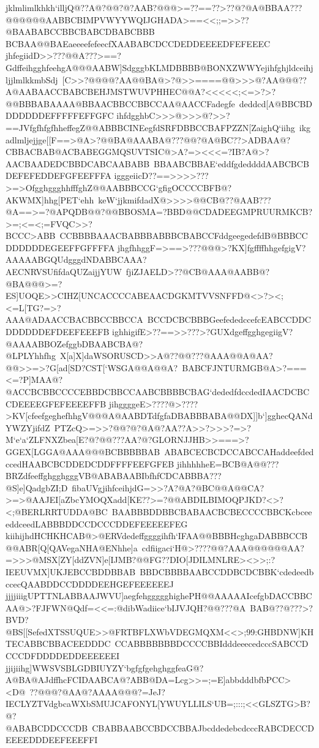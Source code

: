 {{{ jklmlimlkhkh`illjQ@??A@?@@?@?AAB?@@@>=??==??>??@?@A@BBAA???@@@@@@AABBCBIMPVWYYWQIJGHADA>==<<;;=>>??@BAABABCCBBCBABCDBABCBBB%
 BCBAA@@BAEaeeeefefeecfXAABABCDCCDEDDEEEEDFEFEEEC}
 \hbox{jhfegiidD>>???@@A???>==?GdffeihgghfeehgA@@@AABW]SdgggbKLMDBBBB@BONXZWWYejihfghjldceihjljjlmlkkmbSdj%
 [C>>?@@@@?AA@@BA@>?@>>====@@>>>@?AA@@@??A@AABAACCBABCBEHJMSTWUVPHHEC@@A?<<<<<;<=>?>?@@BBBABAAAA@BBAACBBCCBBCCAA@AACCFadegfe%
 deddcd[A@BBCBDDDDDDDEFFFFFEFFGFC}
 \hbox{ihfdgghbC>>>@>>>@?>>?==JVfgfhfgfhheffegZ@@ABBBCINEegfdSRFDBBCCBAFPZZN[ZaighQ`iihg%
 ikgadlmljejjge[[F==>@A>?@@BA@AAABA@???@@?@A@BC??>ADBAA@?CBBACBAB@ACBABEGGMQSUVTSIC@>A?=><<<=?IB?A@>?AACBAADEDCBBDCABCAABABB%
 BBAABCBBAE`eddfgdeddddAABCBCBDEFEFEDDEFGFEEFFFA}
 \hbox{igggeiicD??==>>>>???>=>OfgghggghhfffghZ@@AABBBCCG`gfigOCCCCBFB@?AKWMX]hhg[PET`ehh%
 keW`jjkmifdadX@>>>>@@CB@??@AAB???@A==>=?@APQDB@@?@@BBOSMA=?BBD@@CDADEEGMPRUURMKCB?>=;<=<;=FVQC>>?BCCC>ABB%
 CCBBBBAAACBABBBABBBCBABCCFddgeegedefdB@BBBCCDDDDDDEGEEFFGFFFFA}
 \hbox{jhgfhhggF=>==>???@@@>?KX]fgffffhhgefgigV?AAAAABGQUdgggdNDABBCAAA?AECNRVSUfifdaQUZaijjYUW%
 fjiZJAELD>??@CB@AAA@AABB@?@BA@@@>=?ES]UOQE>>CIHZ[UNCACCCCABEAACDGKMTVVSNFFD@<>?><;<=L[TG?=>?AAA@ADAACCBACBBCCBBCCA%
 BCCDCBCBBBGeefededccefcEABCCDDCDDDDDDEFDEEFEEEFB}
 \hbox{ighhigifE>??==>>???>?GUXdgeffgghgegiigV?@AAAABBOZefggbDBAABCBA@?@LPLYhhfhg%
 X[a]X]daWSORUSCD>>A@??@@???@AAA@@A@AA?@@>>=>?G[ad[SD?CST[`WSGA@@A@@A?%
 BABCFJNTURMGB@A>?===<=?P]MAA@?@ACCBCBBCCCCEBBDCBBCCAABCBBBBCBAG`dededfdccdedIAACDCBCCDEEEEGFEFEEEEFFB}
 \hbox{jihggggeE>????@>????>KV[cfeefgeghefhhgV@@@A@AABDTdfgfaDBABBBABA@@DX]]b`]gghecQANdYWZYjifdZ%
 PTZcQ>=>>?@@?@?@A@?AA??A>>?>>>?=>?M`e`a`ZLFNXZbea[E?@?@@???AA?@?GLORNJJHB>>===>?GGEX[LGGA@AAA@@@BCBBBBBAB%
 ABABCECBCDCCABCCAHaddeefdedccedHAABCBCDDEDCDDFFFFEEFGFEB}
 \hbox{jihhhhheE=BCB@A@@???BRZdfeeffghgghgggVB@ABABAABIbfhfCDCABBBA???@S]e]QadgbZI;D%
 fibaUVgjihfceihjdG=>>?A?@A?@BC@@A@@CA?>=>@AAJEI[aZbcYMOQXadd[KE??>=?@@ABDILBIMOQPJKD?<>?<;@BERLRRTUDDA@BC%
 BAABBBDDBBCBABAACBCBECCCCBBCKcbceeeddceedLABBBDDCCDCCCDDEFEEEEEFEG}
 \hbox{kiihijhdHCHKHCAB@>@ERVdedeffggggihfh`IFAA@@BBBHcghgaDABBBCCB@@ABR[Q[QAVegaNHA@ENhhe]a%
 cdfiigaci`H@>????@@?AAA@@@@@@AA?=>>>@MSX[ZY[ddZVN]e[IJMB?@@FG??DIO[JDILMNLRE><>>;:?IEEUVMX]UKJEBCCBDDBBAB%
 BBDCBBBBAABCCDDBCDCBBK`cdedeedbccecQAABDDCCDDDDEEHGEFEEEEEEJ}
 \hbox{jjjjiiigUPTTNLABBAAJWVU]aegfehggggghighePH@@AAAAAIcefgbDACCBBCAA@>?FJFWN@Qdf=<<=:@dibWadiice`bIJVJQH?@@???@A%
 BAB@??@???>?BVD?@BS[[SefedXTSSUQUE>>@FRTBFLXWbVDEGMQXM<<>;99:GHBDNW]KHTECABBCBBACEEDDDC%
 CCABBBBBBBDCCCCBBIdddeeecedcccSABCCDCCCDFDDDDEDDEEEEEEI}
 \hbox{jjijiihg]WWSVSBLGDBIUYZY`bgfgfgehghggfeaG@?A@BA@AJdffhcFCIDAABCA@?ABB@DA=Lcg>>=;=E]abbdddbfbPCC><D@%
 ??@@@?@AA@?AAAA@@@?=JeJ?IECLYZTVdgbcaWXbSMUJCAFONYL[YWUYLLILS`UB=;:::;<<GLSZTG>B?@?@ABABCDDCCCDB%
 CBABBAABCCBDCCBBAJbcddedebcdcccRABCDECCDEEEEDDDEEFEEEFFI}
 }}%
